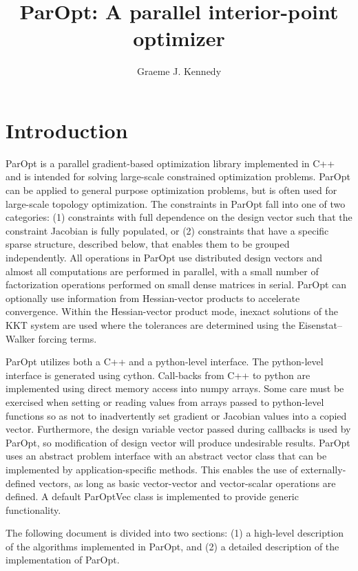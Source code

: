 \documentclass[12pt]{article}
\title{ParOpt: A parallel interior-point optimizer}
\author{Graeme J. Kennedy}
\date{}
\begin{document}
\maketitle

\section{Introduction}

ParOpt is a parallel gradient-based optimization library implemented in C++ and is intended for solving large-scale constrained optimization problems.
ParOpt can be applied to general purpose optimization problems, but is often used for large-scale topology optimization. 
The constraints in ParOpt fall into one of two categories: (1) constraints with full dependence on the design vector such that the constraint Jacobian is fully populated, or (2) constraints that have a specific sparse structure, described below, that enables them to be grouped independently.
All operations in ParOpt use distributed design vectors and almost all computations are performed in parallel, with a small number of factorization operations performed on small dense matrices in serial.
ParOpt can optionally use information from Hessian-vector products to accelerate convergence.
Within the Hessian-vector product mode, inexact solutions of the KKT system are used where the tolerances are determined using the Eisenstat--Walker forcing terms.

ParOpt utilizes both a C++ and a python-level interface.
The python-level interface is generated using cython.
Call-backs from C++ to python are implemented using direct memory access into numpy arrays.
Some care must be exercised when setting or reading values from arrays passed to python-level functions so as not to inadvertently set gradient or Jacobian values into a copied vector.
Furthermore, the design variable vector passed during callbacks is used by ParOpt, so modification of design vector will produce undesirable results.
ParOpt uses an abstract problem interface with an abstract vector class that can be implemented by application-specific methods.
This enables the use of externally-defined vectors, as long as basic vector-vector and vector-scalar operations are defined.
A default ParOptVec class is implemented to provide generic functionality.

The following document is divided into two sections: (1) a high-level description of the algorithms implemented in ParOpt, and (2) a detailed description of the implementation of ParOpt.
\end{document}
